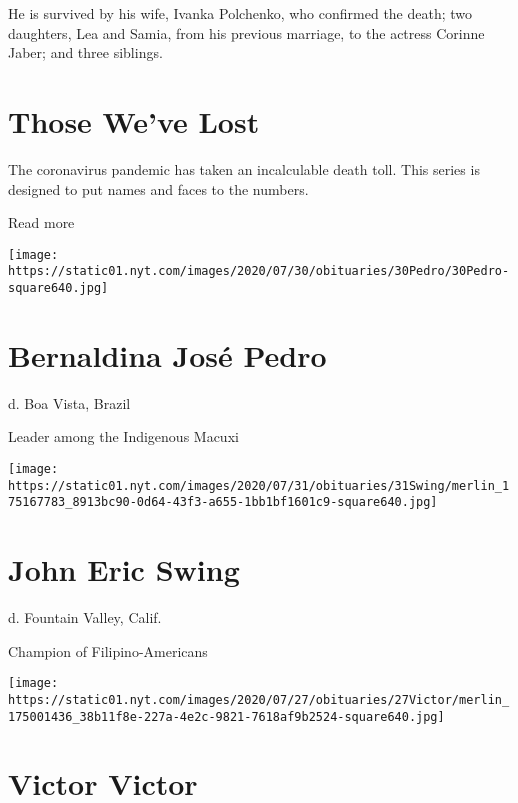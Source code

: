 He is survived by his wife, Ivanka Polchenko, who confirmed the death;
two daughters, Lea and Samia, from his previous marriage, to the actress
Corinne Jaber; and three siblings.

\href{https://www.nytimes.com/interactive/2020/obituaries/people-died-coronavirus-obituaries.html?action=click\&pgtype=Article\&state=default\&region=BELOW_MAIN_CONTENT\&context=covid_obits_promo}{}

\hypertarget{those-weve-lost}{%
\section{Those We've Lost}\label{those-weve-lost}}

The coronavirus pandemic has taken an incalculable death toll. This
series is designed to put names and faces to the numbers.

Read more

\texttt{[image: https://static01.nyt.com/images/2020/07/30/obituaries/30Pedro/30Pedro-square640.jpg]}

\hypertarget{bernaldina-josuxe9-pedro}{%
\section{Bernaldina José Pedro}\label{bernaldina-josuxe9-pedro}}

d. Boa Vista, Brazil

Leader among the Indigenous Macuxi

\texttt{[image: https://static01.nyt.com/images/2020/07/31/obituaries/31Swing/merlin\_175167783\_8913bc90-0d64-43f3-a655-1bb1bf1601c9-square640.jpg]}

\hypertarget{john-eric-swing}{%
\section{John Eric Swing}\label{john-eric-swing}}

d. Fountain Valley, Calif.

Champion of Filipino-Americans

\texttt{[image: https://static01.nyt.com/images/2020/07/27/obituaries/27Victor/merlin\_175001436\_38b11f8e-227a-4e2c-9821-7618af9b2524-square640.jpg]}

\hypertarget{victor-victor}{%
\section{Victor Victor}\label{victor-victor}}

